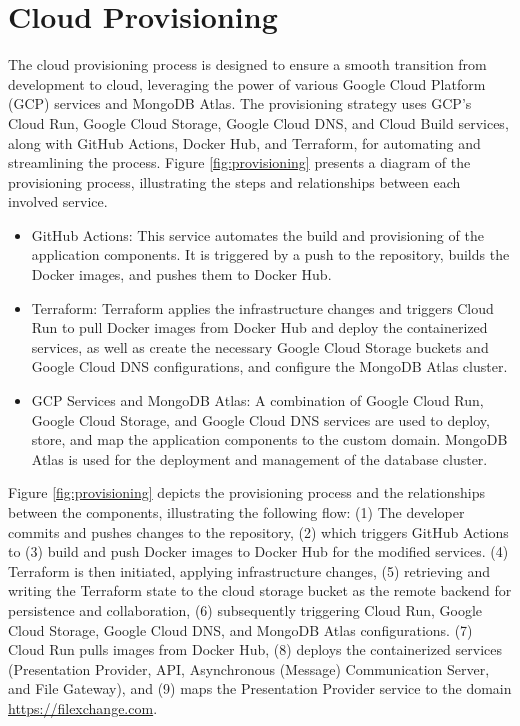 \documentclass[a4paper,fleqn]{cas-dc}
\begin{document}
\section{Cloud Provisioning} \label{sec:provisioning}

The cloud provisioning process is designed to ensure a smooth transition from development to cloud, leveraging the power of various Google Cloud Platform (GCP) services and MongoDB Atlas. The provisioning strategy uses GCP's Cloud Run, Google Cloud Storage, Google Cloud DNS, and Cloud Build services, along with GitHub Actions, Docker Hub, and Terraform, for automating and streamlining the process. Figure \ref{fig:provisioning} presents a diagram of the provisioning process, illustrating the steps and relationships between each involved service.

\begin{itemize}
\item GitHub Actions: This service automates the build and provisioning of the application components. It is triggered by a push to the repository, builds the Docker images, and pushes them to Docker Hub.
\item Terraform: Terraform applies the infrastructure changes and triggers Cloud Run to pull Docker images from Docker Hub and deploy the containerized services, as well as create the necessary Google Cloud Storage buckets and Google Cloud DNS configurations, and configure the MongoDB Atlas cluster.
\item GCP Services and MongoDB Atlas: A combination of Google Cloud Run, Google Cloud Storage, and Google Cloud DNS services are used to deploy, store, and map the application components to the custom domain. MongoDB Atlas is used for the deployment and management of the database cluster.
\end{itemize}

Figure \ref{fig:provisioning} depicts the provisioning process and the relationships between the components, illustrating the following flow: (1) The developer commits and pushes changes to the repository, (2) which triggers GitHub Actions to (3) build and push Docker images to Docker Hub for the modified services. (4) Terraform is then initiated, applying infrastructure changes, (5) retrieving and writing the Terraform state to the cloud storage bucket as the remote backend for persistence and collaboration, (6) subsequently triggering Cloud Run, Google Cloud Storage, Google Cloud DNS, and MongoDB Atlas configurations. (7) Cloud Run pulls images from Docker Hub, (8) deploys the containerized services (Presentation Provider, API, Asynchronous (Message) Communication Server, and File Gateway), and (9) maps the Presentation Provider service to the domain \url{https://filexchange.com}.
\end{document}
